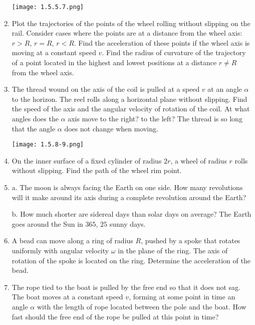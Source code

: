 \documentclass{article}
\begin{document}
\begin{enumerate}[label=1.5.\arabic*]
\begin{center}
    \texttt{[image: 1.5.5.7.png]}
\end{center}

\item Plot the trajectories of the points of the wheel rolling without slipping on the rail. Consider cases where the points are at a distance from the wheel axis: $r > R$, $r = R$, $r < R$. Find the acceleration of these points if the wheel axis is moving at a constant speed $v$. Find the radius of curvature of the trajectory of a point located in the highest and lowest positions at a distance $r \ne R$ from the wheel axis.

\item The thread wound on the axis of the coil is pulled at a speed $v$ at an angle $\alpha$ to the horizon. The reel rolls along a horizontal plane without slipping. Find the speed of the axis and the angular velocity of rotation of the coil. At what angles does the $\alpha$ axis move to the right? to the left? The thread is so long that the angle $\alpha$ does not change when moving.

\begin{center}
    \texttt{[image: 1.5.8-9.png]}
\end{center}

\item On the inner surface of a fixed cylinder of radius $2r$, a wheel of radius $r$ rolls without slipping. Find the path of the wheel rim point.

\item a. The moon is always facing the Earth on one side. How many revolutions will it make around its axis during a complete revolution around the Earth? 

b. How much shorter are sidereal days than solar days on average? The Earth goes around the Sun in $365$, $25$ sunny days.

\item A bead can move along a ring of radius $R$, pushed by a spoke that rotates uniformly with angular velocity $\omega$ in the plane of the ring. The axis of rotation of the spoke is located on the ring. Determine the acceleration of the bead.

\item The rope tied to the boat is pulled by the free end so that it does not sag. The boat moves at a constant speed $v$, forming at some point in time an angle $\alpha$ with the length of rope located between the pole and the boat. How fast should the free end of the rope be pulled at this point in time?


\end{enumerate}
\end{document}
